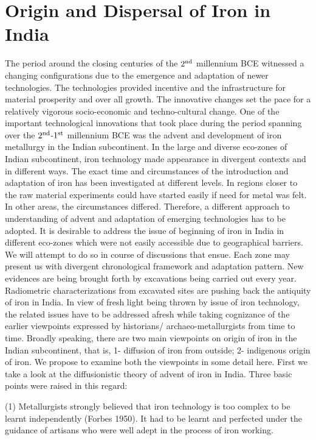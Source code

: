 \chapter{Origin and Dispersal of Iron in India}\label{chapter3}


The period around the closing centuries of the $2^{\rm nd}$ millennium BCE witnessed a changing configurations due to the emergence and adaptation of newer technologies. The technologies provided incentive and the infrastructure for material prosperity and over all growth. The innovative changes set the pace for a relatively vigorous socio-economic and techno-cultural change. One of the important technological innovations that took place during the period spanning over the $2^{\rm nd}$-$1^{\rm st}$ millennium BCE was the advent and development of iron metallurgy in the Indian subcontinent. In the large and diverse eco-zones of Indian subcontinent, iron technology made appearance in divergent contexts and in different ways. The exact time and circumstances of the introduction and adaptation of iron has been investigated at different levels. In regions closer to the raw material experiments could have started easily if need for metal was felt. In other areas, the circumstances differed. Therefore, a different approach to understanding of advent and adaptation of emerging technologies has to be adopted. It is desirable to address the issue of beginning of iron in India in different eco-zones which were not easily accessible due to geographical barriers. We will attempt to do so in course of discussions that ensue. Each zone may present us with divergent chronological framework and adaptation pattern. New evidences are being brought forth by excavations being carried out every year. Radiometric characterizations from excavated sites are pushing back the antiquity of iron in India. In view of fresh light being thrown by issue of iron technology, the related issues have to be addressed afresh while taking cognizance of the earlier viewpoints expressed by historians/ archaeo-metallurgists from time to time. Broadly speaking, there are two main viewpoints on origin of iron in the Indian subcontinent, that is, 1- diffusion of iron from outside; 2- indigenous origin of iron. We propose to examine both the viewpoints in some detail here.  First we take a look at the diffusionistic theory of advent of iron in India. Three basic points were raised in this regard:


(1) Metallurgists strongly believed that iron technology is too complex to be learnt independently (Forbes 1950). It had to be learnt and perfected under the guidance of artisans who were well adept in the process of iron working.

